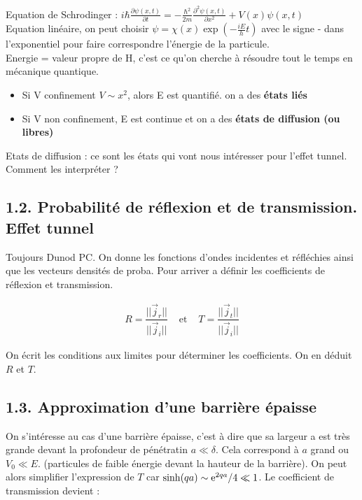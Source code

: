 \documentclass[french, a4paper, 10pt, twocolumn, landscape]{article}
\begin{document}
Equation de Schrodinger : $i\hbar\frac{\partial \psi(x,t)}{\partial t}=-\frac{\hbar^2}{2m}\frac{\partial^2\psi(x,t)}{\partial x^2}+V(x)\psi(x,t)$\\

Equation linéaire, on peut choisir $\psi = \chi(x)\exp\left(-\frac{iE}{h}t\right)$ avec le signe - dans l'exponentiel pour faire correspondre l'énergie de la particule.\\

Energie = valeur propre de H, c'est ce qu'on cherche à résoudre tout le temps en mécanique quantique. 
\begin{itemize}
    \item Si V confinement $V\sim x^2$, alors E est quantifié. on a des \textbf{états liés}
    \item Si V non confinement, E est continue et on a des \textbf{états de diffusion (ou libres)}
\end{itemize}

Etats de diffusion : ce sont les états qui vont nous intéresser pour l'effet tunnel. Comment les interpréter ?


\subsection*{1.2. Probabilité de réflexion et de transmission. Effet tunnel}

Toujours Dunod PC. On donne les fonctions d'ondes incidentes et réfléchies ainsi que les vecteurs densités de proba. Pour arriver a définir les coefficients de réflexion et transmission.

\begin{equation}
    \begin{array}{lll}
        R = \dfrac{||\vec{j}_r||}{||\vec{j}_i||}& \text{ et }& T=\dfrac{||\vec{j}_t||}{||\vec{j}_i||}
    \end{array}
\end{equation}

On écrit les conditions aux limites pour déterminer les coefficients. On en déduit $R$ et $T$.

\subsection*{1.3. Approximation d'une barrière épaisse}

On s'intéresse au cas d'une barrière épaisse, c'est à dire que sa largeur a est très grande devant la profondeur de pénétratin $a\ll \delta$. Cela correspond à $a$ grand ou $V_0 \ll E$. (particules de faible énergie devant la hauteur de la barrière).   On peut alors simplifier l'expression de $T$ car $\sinh(qa)\sim {\rm e}^{2qa}/4\ll 1$. Le coefficient de transmission devient : 
\end{document}
